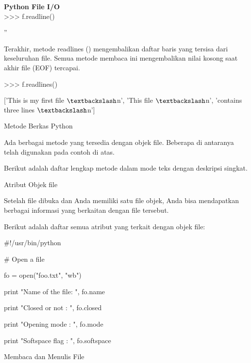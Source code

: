 \begin{center}{\fontsize{24pt}{24pt}\selectfont \textbf{Python File I/O} \\}
>>> f.readline() 

'' 
\vspace{16pt}
 
Terakhir, metode readlines () mengembalikan daftar baris yang tersisa dari keseluruhan file. Semua metode membaca ini mengembalikan nilai kosong saat akhir file (EOF) tercapai. 
\vspace{12pt}

>>> f.readlines() 

['This is my first file $  \textbackslash  $n', 'This file $  \textbackslash  $n', 'contains three lines $  \textbackslash  $n'] 

\vspace{12pt}
\vspace{12pt}

Metode Berkas Python 
\vspace{12pt}
 
Ada berbagai metode yang tersedia dengan objek file. Beberapa di antaranya telah digunakan pada contoh di atas. 
\vspace{12pt}
 
Berikut adalah daftar lengkap metode dalam mode teks dengan deskripsi singkat. 
\vspace{12pt}

Atribut Objek file 
\vspace{12pt}
 
Setelah file dibuka dan Anda memiliki satu file objek, Anda bisa mendapatkan berbagai informasi yang berkaitan dengan file tersebut. 
\vspace{12pt}

Berikut adalah daftar semua atribut yang terkait dengan objek file:
\vspace{16pt}
\vspace{16pt}
\vspace{16pt}

 $  \#  $!/usr/bin/python 
\vspace{12pt}
 
 $  \#  $ Open a file 
 
fo = open("foo.txt", "wb") 

print "Name of the file: ", fo.name 

print "Closed or not : ", fo.closed 

print "Opening mode : ", fo.mode 

print "Softspace flag : ", fo.softspace 
\vspace{12pt}

Membaca dan Menulis File 
\vspace{12pt}


\end{center}
